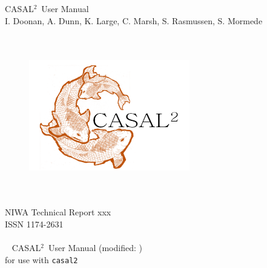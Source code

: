 \documentclass[a4paper,11pt,twoside,pdftex]{article}
\newcommand{\DocYear}{\SourceControlYearDoc}
\newcommand{\DocVer}{\SourceControlDateDoc}
\newcommand{\VER}{\SourceControlShortVersionDoc} %
\newcommand{\CNAME}{CASAL\texorpdfstring{$^2$}{2}} %
\newcommand{\cname}{\texttt{casal2}} %
\newcommand{\authors}{I. Doonan, A. Dunn, K. Large, C. Marsh, S. Rasmussen, S. Mormede}
\begin{document}
\sloppy %



\begin{titlepage}
  \thispagestyle{empty} %
	\begin{center}

		\vspace*{2cm}
		\Huge \CNAME\ User Manual \\

		\vspace{1cm}
		\LARGE \authors \\ %

		\vspace{2cm}
		\begin{figure}[htp]
			\begin{center}
			 \includegraphics[height=7cm,width=7cm]{Figures/casal2.png}
			\end{center}
		\end{figure}
		\vspace{2cm}

		\Large NIWA Technical Report xxx \\%
		\Large ISSN 1174-2631 \\%
		\Large \DocYear \\%

		~\vfill
		\CNAME\ User Manual (modified: \DocVer) \\ for use with \cname\ \VER

	\end{center}
\end{titlepage}
\end{document}
